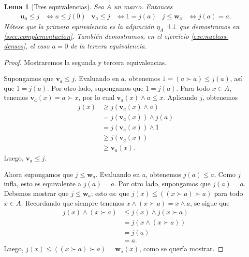 \documentclass[12pt,letterpaper,titlepage]{article}
\newtheorem{lemma}{Lema}
\theoremstyle{definition}
\renewcommand\inf{\wedge}
\newcommand\unuc[1]{\mathbf u_{#1}}
\newcommand\vnuc[1]{\mathbf v_{#1}}
\newcommand\wnuc[1]{\mathbf w_{#1}}
\newcommand\<{\langle}
\renewcommand\>{\rangle}
\begin{document}
\begin{lemma}[Tres equivalencias]
  Sea $A$ un marco.
  Entonces
  \begin{align*}
    \unuc a\leq j &\iff a\leq j(0) &
    \vnuc a\leq j &\iff 1=j(a) &
    j\leq \wnuc a &\iff j(a)=a.
  \end{align*}
  Nótese que la primera equivalencia es la adjunción $\eta_A\dashv\bot$
  que demostramos en \ref{ssec:complementacion}.
  También demostramos, en el ejercicio \ref{exe:nucleos-densos},
  el caso $a=0$ de la tercera equivalencia.
\end{lemma}
\begin{proof}
    Mostraremos la segunda y tercera equivalencias.
    
    Supongamos que $\vnuc a\leq j$.
    Evaluando en $a$, obtenemos $1=(a\succ a)\leq j(a)$,
    así que $1=j(a)$.
    Por otro lado, supongamos que $1=j(a)$.
    Para todo $x\in A$, tenemos $\vnuc a(x)=a\succ x$,
    por lo cual $\vnuc a(x)\inf a\leq x$.
    Aplicando $j$, obtenemos
    \begin{align*}
        j(x)
        &\geq j(\vnuc a(x)\inf a) \\
        &= j(\vnuc a(x))\inf j(a) \\
        &= j(\vnuc a(x))\inf 1 \\
        &\geq j(\vnuc a(x)) \\
        &\geq \vnuc a(x).
    \end{align*}
    Luego, $\vnuc a\leq j$.
    
    Ahora supongamos que $j\leq\wnuc a$.
    Evaluando en $a$, obtenemos $j(a)\leq a$.
    Como $j$ infla, esto es equivalente a $j(a)=a$.
    Por otro lado, supongamos que $j(a)=a$.
    Debemos mostrar que $j\leq\wnuc a$;
    esto es: que $j(x)\leq((x\succ a)\succ a)$
    para todo $x\in A$.
    Recordando que siempre tenemos $x\inf(x\succ a)=x\inf a$,
    se sigue que
    \begin{align*}
        j(x)\inf(x\succ a)
        &\leq j(x)\inf j(x\succ a) \\
        &= j(x\inf (x\succ a)) \\
        &= j(a) \\
        &= a.
    \end{align*}
    Luego, $j(x)\leq((x\succ a)\succ a)=\wnuc a(x)$,
    como se quería mostrar.
\end{proof}
\end{document}
